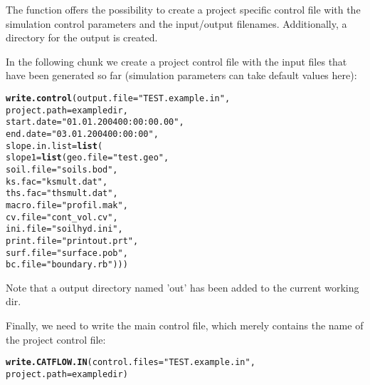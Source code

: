 \documentclass[article,nojss]{jss}\usepackage[]{graphicx}\usepackage[]{xcolor}
\makeatletter
\newcommand{\hlsng}[1]{\textcolor[rgb]{0.192,0.494,0.8}{#1}}%
\newcommand{\hldef}[1]{\textcolor[rgb]{0.345,0.345,0.345}{#1}}%
\newcommand{\hlkwc}[1]{\textcolor[rgb]{0.333,0.667,0.333}{#1}}%
\newcommand{\hlkwd}[1]{\textcolor[rgb]{0.737,0.353,0.396}{\textbf{#1}}}%
\newenvironment{kframe}{%
 \def\at@end@of@kframe{}%
 \ifinner\ifhmode%
  \def\at@end@of@kframe{\end{minipage}}%
  \begin{minipage}{\columnwidth}%
 \fi\fi%
 \def\FrameCommand##1{\hskip\@totalleftmargin \hskip-\fboxsep
 \colorbox{shadecolor}{##1}\hskip-\fboxsep
     \hskip-\linewidth \hskip-\@totalleftmargin \hskip\columnwidth}%
 \MakeFramed {\advance\hsize-\width
   \@totalleftmargin\z@ \linewidth\hsize
   \@setminipage}}%
 {\par\unskip\endMakeFramed%
 \at@end@of@kframe}
\newenvironment{knitrout}{}{} %
\makeatother
\begin{document}
The function  offers the possibility to create a project specific control
file with the simulation control parameters and the input/output filenames. Additionally,
a directory for the output is created.

In the following chunk we create a project control file with the input files that have been generated so far (simulation parameters can take default values here):

\begin{knitrout}
\color{fgcolor}\begin{kframe}
\begin{alltt}
 \hlkwd{write.control}\hldef{(}\hlkwc{output.file} \hldef{=} \hlsng{"TEST.example.in"}\hldef{,}
               \hlkwc{project.path} \hldef{= exampledir,}
               \hlkwc{start.date} \hldef{=} \hlsng{"01.01.2004 00:00:00.00"}\hldef{,}
               \hlkwc{end.date} \hldef{=} \hlsng{"03.01.2004 00:00:00"}\hldef{,}
               \hlkwc{slope.in.list} \hldef{=} \hlkwd{list}\hldef{(}
                \hlkwc{slope1} \hldef{=} \hlkwd{list}\hldef{(} \hlkwc{geo.file} \hldef{=} \hlsng{"test.geo"}\hldef{,}
                               \hlkwc{soil.file} \hldef{=} \hlsng{"soils.bod"}\hldef{,}
                               \hlkwc{ks.fac} \hldef{=} \hlsng{"ksmult.dat"}\hldef{,}
                               \hlkwc{ths.fac} \hldef{=} \hlsng{"thsmult.dat"}\hldef{,}
                               \hlkwc{macro.file} \hldef{=} \hlsng{"profil.mak"}\hldef{,}
                               \hlkwc{cv.file} \hldef{=} \hlsng{"cont_vol.cv"}\hldef{,}
                               \hlkwc{ini.file} \hldef{=} \hlsng{"soilhyd.ini"}\hldef{,}
                               \hlkwc{print.file} \hldef{=} \hlsng{"printout.prt"}\hldef{,}
                               \hlkwc{surf.file} \hldef{=} \hlsng{"surface.pob"}\hldef{,}
                               \hlkwc{bc.file} \hldef{=} \hlsng{"boundary.rb"}\hldef{)) )}
\end{alltt}
\end{kframe}
\end{knitrout}

Note that a output directory named 'out' has been added to the current working dir.


Finally, we need to write the main control file, which merely contains the name of the project control file:
\begin{knitrout}
\color{fgcolor}\begin{kframe}
\begin{alltt}
 \hlkwd{write.CATFLOW.IN}\hldef{(}\hlkwc{control.files}\hldef{=}\hlsng{"TEST.example.in"}\hldef{,}
                  \hlkwc{project.path} \hldef{= exampledir)}
\end{alltt}
\end{kframe}
\end{knitrout}
\end{document}
